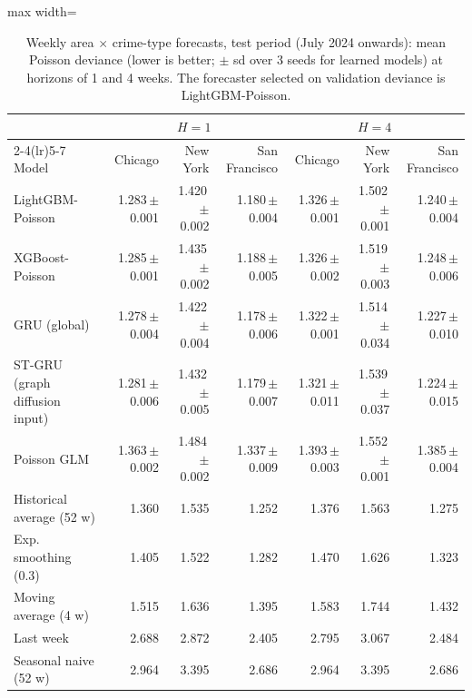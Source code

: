 \begin{table}[!htbp]\centering\scriptsize\setlength{\tabcolsep}{3.5pt}
\caption{Weekly area $\times$ crime-type forecasts, test period (July 2024 onwards): mean Poisson deviance (lower is better; $\pm$ sd over 3 seeds for learned models) at horizons of 1 and 4 weeks. The forecaster selected on validation deviance is LightGBM-Poisson.}\label{tab:weekly}
\begin{adjustbox}{max width=\linewidth}\begin{tabular}{lrrrrrr}\toprule
 & \multicolumn{3}{c}{$H=1$} & \multicolumn{3}{c}{$H=4$}\\\cmidrule(lr){2-4}\cmidrule(lr){5-7}
Model & Chicago & New York & San Francisco & Chicago & New York & San Francisco\\\midrule
LightGBM-Poisson & 1.283\,{\tiny$\pm$0.001} & 1.420\,{\tiny$\pm$0.002} & 1.180\,{\tiny$\pm$0.004} & 1.326\,{\tiny$\pm$0.001} & 1.502\,{\tiny$\pm$0.001} & 1.240\,{\tiny$\pm$0.004} \\
XGBoost-Poisson & 1.285\,{\tiny$\pm$0.001} & 1.435\,{\tiny$\pm$0.002} & 1.188\,{\tiny$\pm$0.005} & 1.326\,{\tiny$\pm$0.002} & 1.519\,{\tiny$\pm$0.003} & 1.248\,{\tiny$\pm$0.006} \\
GRU (global) & 1.278\,{\tiny$\pm$0.004} & 1.422\,{\tiny$\pm$0.004} & 1.178\,{\tiny$\pm$0.006} & 1.322\,{\tiny$\pm$0.001} & 1.514\,{\tiny$\pm$0.034} & 1.227\,{\tiny$\pm$0.010} \\
ST-GRU (graph diffusion input) & 1.281\,{\tiny$\pm$0.006} & 1.432\,{\tiny$\pm$0.005} & 1.179\,{\tiny$\pm$0.007} & 1.321\,{\tiny$\pm$0.011} & 1.539\,{\tiny$\pm$0.037} & 1.224\,{\tiny$\pm$0.015} \\
Poisson GLM & 1.363\,{\tiny$\pm$0.002} & 1.484\,{\tiny$\pm$0.002} & 1.337\,{\tiny$\pm$0.009} & 1.393\,{\tiny$\pm$0.003} & 1.552\,{\tiny$\pm$0.001} & 1.385\,{\tiny$\pm$0.004} \\
Historical average (52 w) & 1.360 & 1.535 & 1.252 & 1.376 & 1.563 & 1.275 \\
Exp. smoothing (0.3) & 1.405 & 1.522 & 1.282 & 1.470 & 1.626 & 1.323 \\
Moving average (4 w) & 1.515 & 1.636 & 1.395 & 1.583 & 1.744 & 1.432 \\
Last week & 2.688 & 2.872 & 2.405 & 2.795 & 3.067 & 2.484 \\
Seasonal naive (52 w) & 2.964 & 3.395 & 2.686 & 2.964 & 3.395 & 2.686 \\
\bottomrule\end{tabular}\end{adjustbox}\end{table}
